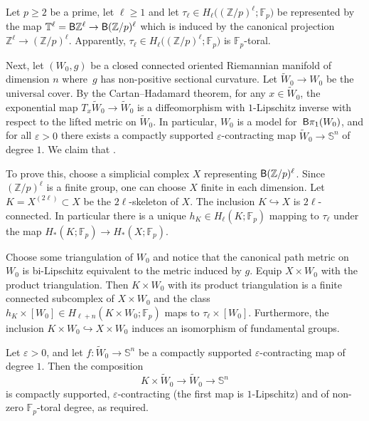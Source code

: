 \documentclass[pdftex]{sigma}
\numberwithin{equation}{section}
\newcommand{\F}{\mathbb{F}}
\newcommand{\Z}{\mathbb{Z}}
\newcommand{\SSS}{\mathbb{S}}
\newcommand{\TTT}{\mathbb{T}}
\newcommand{\eps}{\varepsilon}
\newcommand{\sB}{{\sf B}}
\begin{document}
\begin{Example} \label{ex:torsion} Let $p \geq 2$ be a prime, let $\ell \geq 1$ and let $\tau_\ell \in H_\ell \big( (\Z/p)^\ell ; \F_p\big)$ be represented by the map
$
 \TTT^\ell = \sB \Z^{\ell} \to \sB (\Z/p)^{\ell}$
which is induced by the canonical projection $\Z^{\ell} \to (\Z/p)^{\ell}$.
Apparently, $\tau_\ell \in H_\ell\big( (\Z/p)^{\ell} ; \F_p\big)$ is $\F_p$-toral.

Next, let $(W_0, g)$ be a closed connected oriented Riemannian manifold of dimension $n$ where~$g$ has non-positive sectional curvature.
Let $\tilde W_0 \to W_0$ be the universal cover.
By the Cartan--Hadamard theorem, for any $x \in \tilde W_0$, the exponential map $T_x \tilde W_0 \to \tilde W_0$ is a diffeomorphism with $1$-Lipschitz inverse with respect to the lifted metric on $\tilde W_0$.
In particular, $W_0$ is a model for~$\sB \pi_1(W_0)$, and for all $\eps>0$ there exists a compactly supported $\eps$-contracting map $\tilde W_0 \to \SSS^n$ of degree $1$.
We claim that \smash{$\tau_\ell \times [W_0] \in H_{\ell + n}^{\text{\rm tor-}\ell/{\F_p}\text{\rm -enl}}\big((\Z/p)^{\ell} \times \pi_1(W_0) ; \F_p\big)$}.

To prove this, choose a simplicial complex $X$ representing $\sB (\Z/p)^{\ell}$.
Since $(\Z/p)^{\ell}$ is a finite group, one can choose $X$ finite in each dimension.
Let $K = X^{(2\ell)} \subset X$ be the $2\ell$-skeleton of $X$.
The inclusion $K \hookrightarrow X$ is $2 \ell $-connected.
In particular there is a unique $h_K \in H_\ell( K ; \F_p)$ mapping to $\tau_\ell$ under the map $H_*(K ; \F_p) \to H_*(X ; \F_p)$.


Choose some triangulation of $W_0$ and notice that the canonical path metric on $W_0$ is bi-Lipschitz equivalent to the metric induced by $g$.
Equip $X \times W_0$ with the product triangulation.
Then $K \times W_0$ with its product triangulation is a finite connected subcomplex of $X \times W_0$ and the class $h_K \times [W_0] \in H_{\ell + n}(K \times W_0 ; \F_p)$ maps to $\tau_\ell \times [W_0]$.
Furthermore, the inclusion $K \times W_0 \hookrightarrow X \times W_0$ induces an isomorphism of fundamental groups.


Let $\eps> 0 $, and let $f \colon \tilde W_0 \to \SSS^{n}$ be a compactly supported $\eps$-contracting map of degree $1$.
Then the composition
\[
 K \times \tilde W_0 \to \tilde W_0 \to \SSS^{n}
\]
is compactly supported, $\eps$-contracting (the first map is $1$-Lipschitz) and of non-zero $\F_p$-toral degree, as required.


\end{Example}
\end{document}
